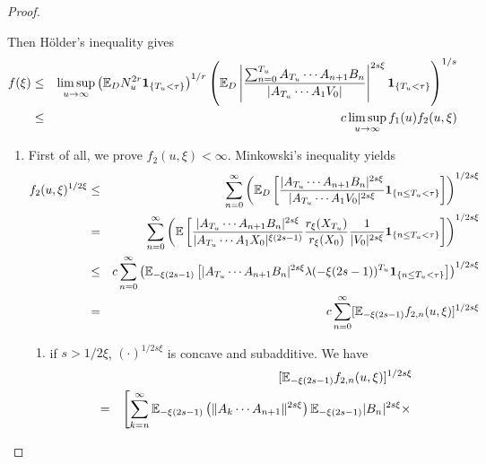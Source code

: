 \documentclass{article}
\begin{document}
\begin{proof}
\begin{enumerate}
    Then H\"older's
    inequality gives
    \begin{eqnarray*}
      f(\xi) &\leq& \limsup_{u \to \infty}
      \left(\mathbb{E}_D N_u^{2r} \mathbf{1}_{\{T_u < \tau\}}\right)^{1/r}
      \left(\mathbb{E}_D \left|
          \frac{
            \sum_{n=0}^{T_u} A_{T_u} \cdots A_{n+1} B_n 
          }{
            |A_{T_u} \cdots A_1 V_0|
          }
        \right|^{2 s \xi} \mathbf{1}_{\{T_u < \tau\}}
      \right)^{1/s} \\
      &\leq& c \limsup_{u \to \infty} f_1(u) f_2(u, \xi)
    \end{eqnarray*}
    \begin{enumerate}
    \item First of all, we prove $f_2(u,\xi) < \infty$. Minkowski's
      inequality yields
      \begin{eqnarray*}
        f_2(u, \xi)^{1/2\xi} &\leq& \sum_{n=0}^\infty \left(\mathbb{E}_D \left[
            \frac{
              |A_{T_u} \cdots A_{n+1} B_n |^{2s\xi}
            }{
              |A_{T_u} \cdots A_1 V_0|^{2s\xi}
            } \mathbf{1}_{\{n \leq T_u < \tau\}}
          \right]\right)^{1/2s\xi} \\
        &=& \sum_{n=0}^\infty \left(\mathbb{E} \left[
            \frac{
              |A_{T_u} \cdots A_{n+1} B_n |^{2s\xi}
            }{
              |A_{T_u} \cdots A_1 X_0|^{\xi(2s - 1)}
            }
            \frac{
              r_{\xi}(X_{T_u})
            }{
              r_{\xi}(X_{0})
            }
            {1 \over |V_0|^{2s\xi}}\mathbf{1}_{\{n \leq T_u < \tau\}}
          \right]\right)^{1/2s\xi} \\
        &\leq& c \sum_{n=0}^\infty
        \left(\mathbb{E}_{-\xi(2s - 1)} \left[
            |A_{T_u} \cdots A_{n+1} B_n |^{2s\xi}
            \lambda(-\xi(2s - 1))^{T_u}
            \mathbf{1}_{\{n \leq T_u < \tau\}}
          \right]\right)^{1/2s\xi} \\
        &=& c \sum_{n=0}^\infty [\mathbb{E}_{-\xi(2s - 1)}
        f_{2,n}(u,\xi)]^{1/2s\xi}
      \end{eqnarray*}
      \begin{enumerate}
      \item if $s > 1/2\xi$, $(\cdot)^{1/2s\xi}$ is concave and
        subadditive. We have
        \begin{eqnarray*}
          && [\E_{-\xi(2s - 1)} f_{2,n}(u,\xi)]^{1/2s\xi} \\
          &=& \left[
              \sum_{k=n}^\infty
              \E_{-\xi(2s - 1)}\left(
              \|A_k \cdots A_{n+1}\|^{2s\xi}
              \right)
              \E_{-\xi(2s - 1)} |B_n|^{2s\xi} \times \right.\\

\end{eqnarray*}
\end{enumerate}
\end{enumerate}
\end{enumerate}
\end{proof}
\end{document}
